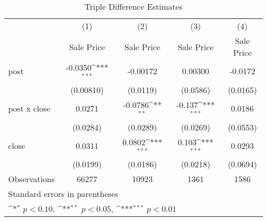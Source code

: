 \begin{table}[htbp]\centering
\def\sym#1{\ifmmode^{#1}\else\(^{#1}\)\fi}
\caption{Triple Difference Estimates\label{tabl}}
\begin{tabular}{l*{4}{c}}
\hline\hline
                    &\multicolumn{1}{c}{(1)}&\multicolumn{1}{c}{(2)}&\multicolumn{1}{c}{(3)}&\multicolumn{1}{c}{(4)}\\
                    &\multicolumn{1}{c}{Sale Price}&\multicolumn{1}{c}{Sale Price}&\multicolumn{1}{c}{Sale Price}&\multicolumn{1}{c}{Sale Price}\\
\hline
post                &     -0.0350\sym{***}&    -0.00172         &     0.00300         &     -0.0172         \\
                    &   (0.00810)         &    (0.0119)         &    (0.0586)         &    (0.0165)         \\
[1em]
post x close        &      0.0271         &     -0.0786\sym{**} &      -0.137\sym{***}&      0.0186         \\
                    &    (0.0284)         &    (0.0289)         &    (0.0269)         &    (0.0553)         \\
[1em]
close               &      0.0311         &      0.0802\sym{***}&       0.103\sym{***}&      0.0293         \\
                    &    (0.0199)         &    (0.0186)         &    (0.0218)         &    (0.0694)         \\
\hline
Observations        &       66277         &       10923         &        1361         &        1586         \\
\hline\hline
\multicolumn{5}{l}{\footnotesize Standard errors in parentheses}\\
\multicolumn{5}{l}{\footnotesize \sym{*} \(p<0.10\), \sym{**} \(p<0.05\), \sym{***} \(p<0.01\)}\\
\end{tabular}
\end{table}
